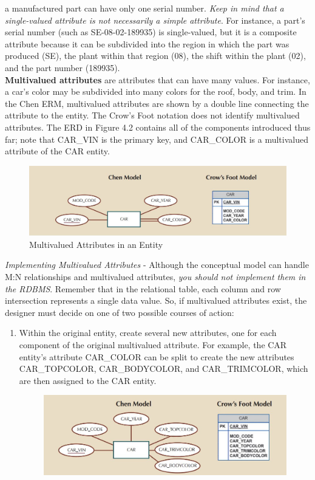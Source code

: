 \documentclass[a4paper, 12pt, titlepage]{report}
\begin{document}
{a manufactured part can have only one serial number. \emph{Keep in mind that a single-valued attribute is not necessarily a simple attribute}. For instance, a part’s serial number (such as SE-08-02-189935) is single-valued, but it is a composite attribute because it can be subdivided into the region in which the part was produced (SE), the plant within that region (08), the shift within the plant (02), and the part number (189935).\\
\textbf{Multivalued attributes} are attributes that can have many values. For instance, a car’s color may be subdivided into many colors for the roof, body, and trim. In the Chen ERM, multivalued attributes are shown by a double line connecting the attribute to the entity. The Crow’s Foot notation does not identify multivalued attributes. The ERD in Figure 4.2 contains all of the components introduced thus far; note that CAR\_VIN is the primary key, and CAR\_COLOR is a multivalued attribute of the CAR entity.
\begin{figure}[H]
\centering
\includegraphics[scale=0.5]{Attr2}
\caption{Multivalued Attributes in an Entity}
\end{figure}
\noindent\emph{Implementing Multivalued Attributes} - Although the conceptual model can handle M:N relationships and multivalued attributes, \emph{you should not implement them in the
RDBMS}. Remember that in the relational table, each column and row intersection represents a single data value. So, if multivalued attributes exist, the designer must decide on one of two possible courses of action:
\begin{enumerate}
\item Within the original entity, create several new attributes, one for each component of the original multivalued attribute. For example, the CAR entity’s attribute CAR\_COLOR
can be split to create the new attributes CAR\_TOPCOLOR, CAR\_BODYCOLOR, and CAR\_TRIMCOLOR, which are then assigned to the CAR entity. \\
\begin{figure}[H]
\centering
\includegraphics[scale=0.5]{Attr3}

\end{figure}
\end{enumerate}}
\end{document}
